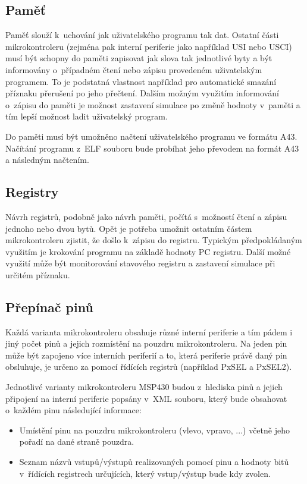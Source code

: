 \subsection{Paměť}

Paměť slouží k~uchování jak uživatelského programu tak dat. Ostatní části mikrokontroleru (zejména pak interní periferie jako například USI nebo USCI) musí být schopny do paměti zapisovat jak slova tak jednotlivé byty a být informovány o~případném čtení nebo zápisu provedeném uživatelským programem. To je podstatná vlastnost například pro automatické smazání příznaku přerušení po jeho přečtení. Dalším možným využitím informování o~zápisu do paměti je možnost zastavení simulace po změně hodnoty v~paměti a tím lepší možnost ladit uživatelský program.

Do paměti musí být umožněno načtení uživatelského programu ve formátu A43. Načítání programu z~ELF souboru bude probíhat jeho převodem na formát A43 a následným načtením.

\subsection{Registry}

Návrh registrů, podobně jako návrh paměti, počítá s~možností čtení a zápisu jednoho nebo dvou bytů. Opět je potřeba umožnit ostatním částem mikrokontroleru zjistit, že došlo k~zápisu do registru. Typickým předpokládaným využitím je krokování programu na základě hodnoty PC registru. Další možné využití může být monitorování stavového registru a zastavení simulace při určitém příznaku.

\subsection{Přepínač pinů}

Každá varianta mikrokontroleru obsahuje různé interní periferie a tím pádem i jiný počet pinů a jejich rozmístění na pouzdru mikrokontroleru. Na jeden pin může být zapojeno více interních periferií a to, která periferie právě daný pin obsluhuje, je určeno za pomocí řídících registrů (například PxSEL a PxSEL2).

Jednotlivé varianty mikrokontroleru MSP430 budou z~hlediska pinů a jejich připojení na interní periferie popsány v~XML souboru, který bude obsahovat o~každém pinu následující informace:

\begin{itemize}
\item Umístění pinu na pouzdru mikrokontroleru (vlevo, vpravo, ...) včetně jeho pořadí na dané straně pouzdra.
\item Seznam názvů vstupů/výstupů realizovaných pomocí pinu a hodnoty bitů v~řídících registrech určujících, který vstup/výstup bude kdy zvolen.
\end{itemize}

